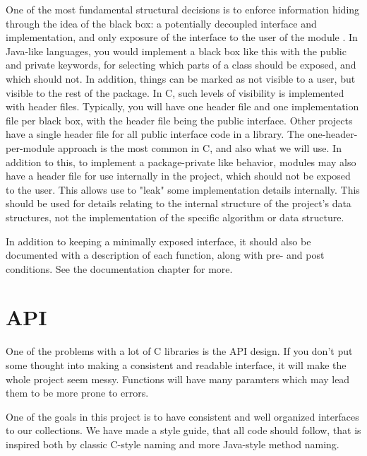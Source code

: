 \documentclass[table]{ituthesis}
\begin{document}
One of the most fundamental structural decisions is to enforce information hiding through the idea of the black box: a potentially decoupled interface and implementation, and only exposure of the interface to the user of the module \cite{Gelder2001}. In Java-like languages, you would implement a black box like this with the public and private keywords, for selecting which parts of a class should be exposed, and which should not. In addition, things can be marked as not visible to a user, but visible to the rest of the package. In C, such levels of visibility is implemented with header files. Typically, you will have one header file and one implementation file per black box, with the header file being the public interface. Other projects have a single header file for all public interface code in a library. The one-header-per-module approach is the most common in C, and also what we will use. In addition to this, to implement a package-private like behavior, modules may also have a header file for use internally in the project, which should not be exposed to the user. This allows use to "leak" some implementation details internally. This should be used for details relating to the internal structure of the project's data structures, not the implementation of the specific algorithm or data structure.

In addition to keeping a minimally exposed interface, it should also be documented with a description of each function, along with pre- and post conditions. See the documentation chapter for more.


\section{API}\label{sec:arch_api}
	One of the problems with a lot of C libraries is the API design. If you don't put some thought into making a consistent and readable interface, it will make the whole project seem messy. Functions will have many paramters which may lead them to be more prone to errors.

	One of the goals in this project is to have consistent and well organized interfaces to our collections. We have made a style guide, that all code should follow, that is inspired both by classic C-style naming and more Java-style method naming.
\end{document}
